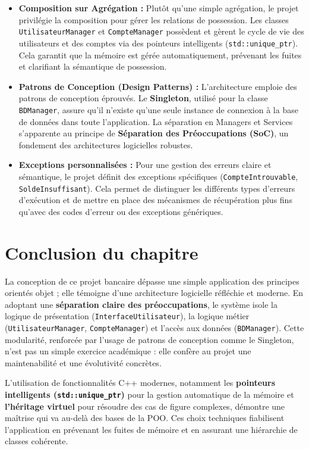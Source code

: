 \begin{itemize}[leftmargin=*]
  \item \textbf{Composition sur Agrégation :} Plutôt qu'une simple agrégation, le projet privilégie la composition pour gérer les relations de possession. Les classes \texttt{UtilisateurManager} et \texttt{CompteManager} possèdent et gèrent le cycle de vie des utilisateurs et des comptes via des pointeurs intelligents (\texttt{std::unique\_ptr}). Cela garantit que la mémoire est gérée automatiquement, prévenant les fuites et clarifiant la sémantique de possession.

  \item \textbf{Patrons de Conception (Design Patterns) :} L'architecture emploie des patrons de conception éprouvés. Le \textbf{Singleton}, utilisé pour la classe \texttt{BDManager}, assure qu'il n'existe qu'une seule instance de connexion à la base de données dans toute l'application. La séparation en Managers et Services s'apparente au principe de \textbf{Séparation des Préoccupations (SoC)}, un fondement des architectures logicielles robustes.

  \item \textbf{Exceptions personnalisées :} Pour une gestion des erreurs claire et sémantique, le projet définit des exceptions spécifiques (\texttt{CompteIntrouvable}, \texttt{SoldeInsuffisant}). Cela permet de distinguer les différents types d'erreurs d'exécution et de mettre en place des mécanismes de récupération plus fins qu'avec des codes d'erreur ou des exceptions génériques.
\end{itemize}

\section{Conclusion du chapitre}
La conception de ce projet bancaire dépasse une simple application des principes orientés objet ; elle témoigne d'une architecture logicielle réfléchie et moderne. En adoptant une \textbf{séparation claire des préoccupations}, le système isole la logique de présentation (\texttt{InterfaceUtilisateur}), la logique métier (\texttt{UtilisateurManager}, \texttt{CompteManager}) et l'accès aux données (\texttt{BDManager}). Cette modularité, renforcée par l'usage de patrons de conception comme le Singleton, n'est pas un simple exercice académique : elle confère au projet une maintenabilité et une évolutivité concrètes.

L'utilisation de fonctionnalités C++ modernes, notamment les \textbf{pointeurs intelligents (\texttt{std::unique\_ptr})} pour la gestion automatique de la mémoire et \textbf{l'héritage virtuel} pour résoudre des cas de figure complexes, démontre une maîtrise qui va au-delà des bases de la POO. Ces choix techniques fiabilisent l'application en prévenant les fuites de mémoire et en assurant une hiérarchie de classes cohérente.

